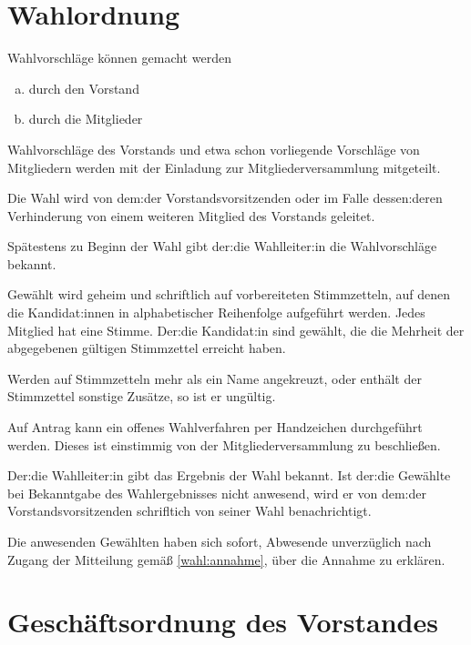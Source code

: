 \section{Wahlordnung}
\begin{wahl}
  \label{wahlordnung}

  Wahlvorschläge können gemacht werden
  \begin{enumerate}[(a)]
    \item durch den Vorstand
    \item durch die Mitglieder
  \end{enumerate}

  Wahlvorschläge des Vorstands und etwa schon vorliegende Vorschläge von Mitgliedern werden mit der Einladung zur Mitgliederversammlung mitgeteilt.

  Die Wahl wird von dem:der Vorstandsvorsitzenden oder im Falle dessen:deren Verhinderung von einem weiteren Mitglied des Vorstands geleitet.

  Spätestens zu Beginn der Wahl gibt der:die Wahlleiter:in die Wahlvorschläge bekannt.

  Gewählt wird geheim und schriftlich auf vorbereiteten Stimmzetteln, auf denen die Kandidat:innen in alphabetischer Reihenfolge aufgeführt werden. Jedes Mitglied hat eine Stimme. Der:die Kandidat:in sind gewählt, die die Mehrheit der abgegebenen gültigen Stimmzettel erreicht haben.

  Werden auf Stimmzetteln mehr als ein Name angekreuzt, oder enthält der Stimmzettel sonstige Zusätze, so ist er ungültig.

  Auf Antrag kann ein offenes Wahlverfahren per Handzeichen durchgeführt werden. Dieses ist einstimmig von der Mitgliederversammlung zu beschließen.

  Der:die Wahlleiter:in gibt das Ergebnis der Wahl bekannt. Ist der:die Gewählte bei Bekanntgabe des Wahlergebnisses nicht anwesend, wird er von dem:der Vorstandsvorsitzenden schrifltich von seiner Wahl benachrichtigt.
  \label{wahl:annahme}

  Die anwesenden Gewählten haben sich sofort, Abwesende unverzüglich nach Zugang der Mitteilung gemäß \ref{wahl:annahme}, über die Annahme zu erklären.

\end{wahl}

\section{Geschäftsordnung des Vorstandes}

